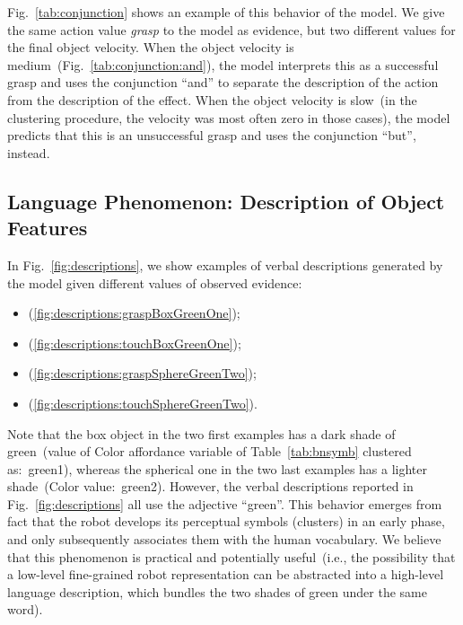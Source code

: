 Fig.~\ref{tab:conjunction} shows an example of this behavior of the model.
We give the same action value \emph{grasp} to the model as evidence, but two different values for the final object velocity.
When the object velocity is medium~(Fig.~\ref{tab:conjunction:and}), the model interprets this as a successful grasp and uses the conjunction ``and'' to separate the description of the action from the description of the effect.
When the object velocity is slow~(in the clustering procedure, the velocity was most often zero in those cases), the model predicts that this is an unsuccessful grasp and uses the conjunction ``but'', instead.

\subsection{Language Phenomenon: Description of Object Features}
\label{sec:results:description_objects}

In Fig.~\ref{fig:descriptions}, we show examples of verbal descriptions generated by the model given different values of observed evidence:
\begin{itemize}
\item \small \evidenceProducingGraspBoxGreenOne \normalsize (\ref{fig:descriptions:graspBoxGreenOne});

\item \small \evidenceProducingTouchBoxGreenOne \normalsize (\ref{fig:descriptions:touchBoxGreenOne});

\item \small \evidenceProducingGraspSphereGreenTwo \normalsize (\ref{fig:descriptions:graspSphereGreenTwo});

\item \small \evidenceProducingTouchSphereGreenTwo \normalsize (\ref{fig:descriptions:touchSphereGreenTwo}).
\end{itemize}
Note that the box object in the two first examples has a dark shade of green~(value of Color affordance variable of Table~\ref{tab:bnsymb} clustered as:~green1), whereas the spherical one in the two last examples has a lighter shade~(Color value:~green2).
However, the verbal descriptions reported in Fig.~\ref{fig:descriptions} all use the adjective ``green''.
This behavior emerges from fact that the robot develops its perceptual symbols (clusters) in an early phase, and only subsequently associates them with the human vocabulary.
We believe that this phenomenon is practical and potentially useful~(i.e., the possibility that a low-level fine-grained robot representation can be abstracted into a high-level language description, which bundles the two shades of green under the same word).
